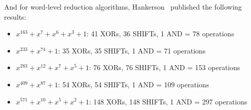 And for word-level reduction algorithms, Hankerson~\cite[p. 76]{hankerson2006guide} published the following results:

\begin{itemize}
\item $x^{163} + x^7 + x^6 + x^3 + 1$: 41 XORs, 36 SHIFTs, 1 AND = 78 operations
\item $x^{233} + x^{74} + 1$: 35 XORs, 35 SHIFTs, 1 AND = 71 operations
\item $x^{283} + x^{12} + x^7 + x^5 + 1$: 76 XORs, 76 SHIFTs, 1 AND = 153 operations
\item $x^{409} + x^{87} + 1$: 54 XORs, 54 SHIFTs, 1 AND = 109 operations
\item $x^{571} + x^{10} + x^5 + x^2 + 1$: 148 XORs, 148 SHIFTs, 1 AND = 297 operations
\end{itemize}

